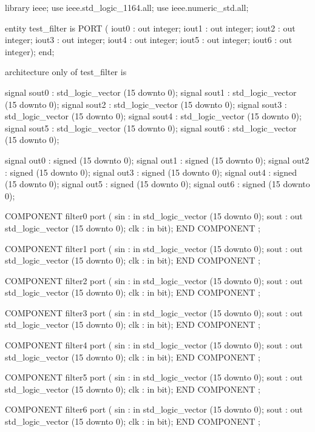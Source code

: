 \documentclass[a4paper,12pt]{article}
\begin{document}
\begin{vhdlcode}
library ieee;
use ieee.std_logic_1164.all;
use ieee.numeric_std.all;

  

entity test_filter is
    PORT (
             iout0 : out integer;
            iout1 : out integer;
            iout2 : out integer;
            iout3 : out integer;
            iout4 : out integer;
            iout5 : out integer;
            iout6 : out integer);
end;

architecture only of test_filter is

signal sout0 : std_logic_vector (15 downto 0);
signal sout1 : std_logic_vector (15 downto 0);
signal sout2 : std_logic_vector (15 downto 0);
signal sout3 : std_logic_vector (15 downto 0);
signal sout4 : std_logic_vector (15 downto 0);
signal sout5 : std_logic_vector (15 downto 0);
signal sout6 : std_logic_vector (15 downto 0);

signal out0 : signed (15 downto 0);
signal out1 : signed (15 downto 0);
signal out2 : signed (15 downto 0);
signal out3 : signed (15 downto 0);
signal out4 : signed (15 downto 0);
signal out5 : signed (15 downto 0);
signal out6 : signed (15 downto 0);

COMPONENT filter0
    port (
        sin : in std_logic_vector (15 downto 0);
        sout : out std_logic_vector (15 downto 0);
        clk : in bit);
END COMPONENT ;

COMPONENT filter1
    port (
        sin : in std_logic_vector (15 downto 0);
        sout : out std_logic_vector (15 downto 0);
        clk : in bit);
END COMPONENT ;

COMPONENT filter2
    port (
        sin : in std_logic_vector (15 downto 0);
        sout : out std_logic_vector (15 downto 0);
        clk : in bit);
END COMPONENT ;

COMPONENT filter3
    port (
        sin : in std_logic_vector (15 downto 0);
        sout : out std_logic_vector (15 downto 0);
        clk : in bit);
END COMPONENT ;

COMPONENT filter4
    port (
        sin : in std_logic_vector (15 downto 0);
        sout : out std_logic_vector (15 downto 0);
        clk : in bit);
END COMPONENT ;

COMPONENT filter5
    port (
        sin : in std_logic_vector (15 downto 0);
        sout : out std_logic_vector (15 downto 0);
        clk : in bit);
END COMPONENT ;

COMPONENT filter6
    port (
        sin : in std_logic_vector (15 downto 0);
        sout : out std_logic_vector (15 downto 0);
        clk : in bit);
END COMPONENT ;


\end{vhdlcode}
\end{document}
